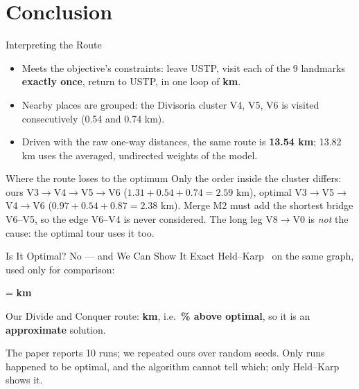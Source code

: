 \section{Conclusion}

\begin{frame}{Interpreting the Route}
  \small
  \begin{itemize}
    \item Meets the objective's constraints: leave USTP, visit each of the 9 landmarks \textbf{exactly once},
          return to USTP, in one loop of \textbf{\DCTotal{} km}.
    \item Nearby places are grouped: the Divisoria cluster V4, V5, V6 is visited consecutively
          (0.54 and 0.74 km).
    \item Driven with the raw one-way distances, the same route is \textbf{13.54 km}; 13.82 km uses the
          averaged, undirected weights of the model.
  \end{itemize}
  \medskip
  \begin{block}{Where the route loses to the optimum}
    \footnotesize
    Only the order inside the cluster differs: ours V3$\to$V4$\to$V5$\to$V6 ($1.31+0.54+0.74 = 2.59$ km),
    optimal V3$\to$V5$\to$V4$\to$V6 ($0.97+0.54+0.87 = 2.38$ km). Merge M2 must add the shortest bridge
    V6--V5, so the edge V6--V4 is never considered. The long leg V8$\to$V0 is \emph{not} the cause:
    the optimal tour uses it too.
  \end{block}
\end{frame}

\begin{frame}{Is It Optimal? No --- and We Can Show It}
  \small
  Exact Held--Karp~\cite{heldkarp1962} on the same graph, used only for comparison:
  \begin{center}
    \OptRoute{} \quad = \textbf{\OptTotal{} km}
  \end{center}
  Our Divide and Conquer route: \textbf{\DCTotal{} km}, i.e.\ \textbf{\DCGap\% above optimal}, so it is an
  \textbf{approximate} solution.
  \medskip

  \centering
  \scriptsize
  

  \medskip
  \footnotesize The paper reports 10 runs; we repeated ours over \RunCount{} random seeds. Only \BridgeOptHits{}
  runs happened to be optimal, and the algorithm cannot tell which; only Held--Karp shows it.
\end{frame}

